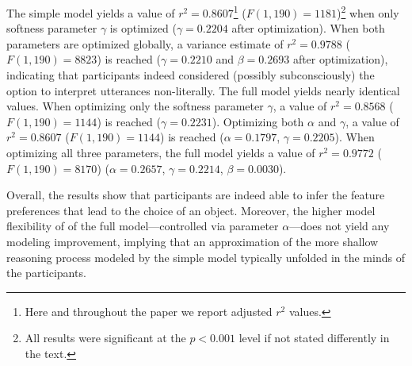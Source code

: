 \documentclass[11pt,a4paper]{article}
\begin{document}
The simple model yields a value of $r^2 = 0.8607$\footnote{Here and throughout the paper we report adjusted $r^2$ values.} ($F(1,190) = 1181$)\footnote{All results were significant at the $p < 0.001$ level if not stated differently in the text.} when only softness parameter $\gamma$ is optimized ($\gamma=0.2204$ after optimization). 
When both parameters are optimized globally, a variance estimate of $r^2 = 0.9788$ ($F(1,190) = 8823$) is reached
($\gamma=0.2210$ and $\beta=0.2693$ after optimization), indicating that participants indeed considered (possibly subconsciously) the option to interpret utterances non-literally. 
The full model yields nearly identical values.
When optimizing only the softness parameter $\gamma$, a value of $r^2 = 0.8568$ ($F(1, 190) = 1144$) is reached ($\gamma=0.2231$).
Optimizing both $\alpha$ and $\gamma$, a value of $r^2 = 0.8607$ ($F(1, 190) = 1144$) is reached ($\alpha=0.1797$, $\gamma=0.2205$).
When optimizing all three parameters, the full model yields a value of $r^2 = 0.9772$ ($F(1, 190) = 8170$) ($\alpha=0.2657$, $\gamma=0.2214$, $\beta=0.0030$).

Overall, the results show that participants are indeed able to infer the feature preferences that lead to the choice of an object. %
Moreover, the higher model flexibility of of the full model---controlled via parameter $\alpha$---does not yield any modeling improvement, implying that an approximation of the more shallow reasoning process modeled by the simple model typically unfolded in the minds of the participants.  

\end{document}
